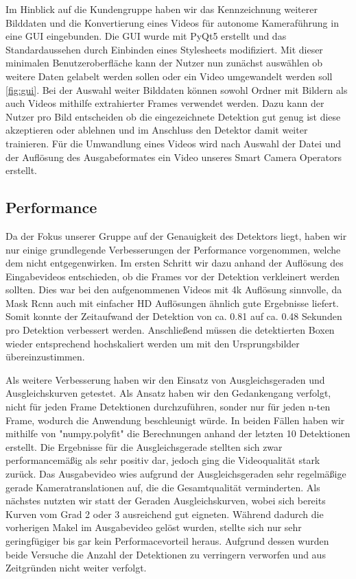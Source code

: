 Im Hinblick auf die Kundengruppe haben wir das Kennzeichnung weiterer Bilddaten und die Konvertierung eines Videos für autonome Kameraführung in eine GUI eingebunden. Die GUI wurde mit PyQt5 erstellt und das Standardaussehen durch Einbinden eines Stylesheets modifiziert. Mit dieser minimalen Benutzeroberfläche kann der Nutzer nun zunächst auswählen ob weitere Daten gelabelt werden sollen oder ein Video umgewandelt werden soll \ref{fig:gui}. Bei der Auswahl weiter Bilddaten können sowohl Ordner mit Bildern als auch Videos mithilfe extrahierter Frames verwendet werden. Dazu kann der Nutzer pro Bild entscheiden ob die eingezeichnete Detektion gut genug ist diese akzeptieren oder ablehnen und im Anschluss den Detektor damit weiter trainieren. Für die Umwandlung eines Videos wird nach Auswahl der Datei und der Auflösung des Ausgabeformates ein Video unseres Smart Camera Operators erstellt.


\subsection*{Performance}
Da der Fokus unserer Gruppe auf der Genauigkeit des Detektors liegt, haben wir nur einige grundlegende Verbesserungen der Performance vorgenommen, welche dem nicht entgegenwirken. 
Im ersten Schritt wir dazu anhand der Auflösung des Eingabevideos entschieden, ob die Frames vor der Detektion verkleinert werden sollten. Dies war bei den aufgenommenen Videos mit 4k Auflösung sinnvolle, da Mask Rcnn auch mit einfacher HD Auflösungen ähnlich gute Ergebnisse liefert. Somit konnte der Zeitaufwand der Detektion von ca. 0.81  auf ca. 0.48 Sekunden pro Detektion verbessert werden. Anschließend müssen die detektierten Boxen wieder entsprechend hochskaliert werden um mit den Ursprungsbilder übereinzustimmen.

Als weitere Verbesserung haben wir den Einsatz von Ausgleichsgeraden und Ausgleichskurven getestet. Als Ansatz haben wir den Gedankengang verfolgt, nicht für jeden Frame Detektionen durchzuführen, sonder nur für jeden n-ten Frame, wodurch die Anwendung beschleunigt würde. 
In beiden Fällen haben wir mithilfe von "numpy.polyfit" die Berechnungen anhand der letzten 10 Detektionen erstellt. Die Ergebnisse für die Ausgleichsgerade stellten sich zwar performancemäßig als sehr positiv dar, jedoch ging die Videoqualität stark zurück. Das Ausgabevideo wies aufgrund der Ausgleichsgeraden sehr regelmäßige gerade Kameratranslationen auf, die die Gesamtqualität verminderten.
Als nächstes nutzten wir statt der Geraden Ausgleichskurven, wobei sich bereits Kurven vom Grad 2 oder 3 ausreichend gut eigneten. Während dadurch die vorherigen Makel im Ausgabevideo gelöst wurden, stellte sich nur sehr geringfügiger bis gar kein Performacevorteil heraus. Aufgrund dessen wurden beide Versuche die Anzahl der Detektionen zu verringern verworfen und aus Zeitgründen nicht weiter verfolgt.




